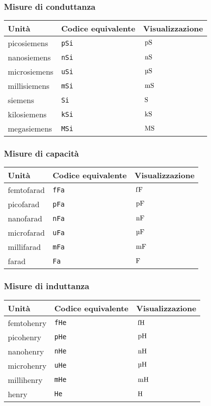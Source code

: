 \documentclass[11pt,a4paper,openany]{book}
\newcommand*{\cs}[1]{\texttt{\char92#1}}
\begin{document}
\subsubsection{Misure di conduttanza}
\begin{center}
\begin{tabular}{lll}
\toprule
Unità & Codice equivalente & Visualizzazione\\
\midrule
picosiemens & \cs{pSi} & $\,\mathrm{pS}$\\
nanosiemens & \cs{nSi} & $\,\mathrm{nS}$ \\
microsiemens &\cs{uSi} & $\uSi$ \\
millisiemens & \cs{mSi} & $\,\mathrm{mS}$ \\
siemens & \cs{Si} & $\,\mathrm{S}$\\
kilosiemens & \cs{kSi} & $\,\mathrm{kS}$\\
megasiemens & \cs{MSi} & $\,\mathrm{MS}$\\
\bottomrule
\end{tabular}
\end{center}

\subsubsection{Misure di capacità} 
\begin{center}
\begin{tabular}{lll}
\toprule
Unità & Codice equivalente & Visualizzazione\\
\midrule
femtofarad & \cs{fFa} & $\,\mathrm{f\/F}$ \\
picofarad & \cs{pFa} & $\,\mathrm{pF}$\\
nanofarad & \cs{nFa} & $\,\mathrm{nF}$ \\
microfarad & \cs{uFa} & $\uFa$\\
millifarad & \cs{mFa} & $\,\mathrm{mF}$ \\
farad & \cs{Fa} & $\,\mathrm{F}$\\
\bottomrule
\end{tabular}
\end{center}

\subsubsection{Misure di induttanza}
\begin{center}
\begin{tabular}{lll}
\toprule
Unità & Codice equivalente & Visualizzazione\\
\midrule
femtohenry & \cs{fHe} & $\,\mathrm{fH}$ \\
picohenry & \cs{pHe} & $\,\mathrm{pH}$\\
nanohenry & \cs{nHe} & $\,\mathrm{nH}$ \\
microhenry & \cs{uHe} & $\uHe$\\
millihenry & \cs{mHe} & $\,\mathrm{mH}$ \\
henry & \cs{He} & $\,\mathrm{H}$\\
\bottomrule
\end{tabular}
\end{center}
\end{document}
